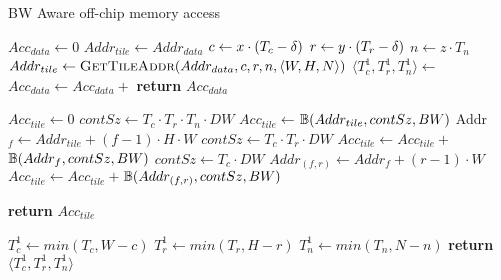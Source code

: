 \begin{algorithm}[H]
	\caption{BW Aware off-chip memory access}
	 \label{Algorithm1}
	 \begin{algorithmic}[1]
	 	 \label{alg:BWA}
	 	\State $Acc_{data}\gets 0$
	 	\State $Addr_{tile}\gets Addr_{data}$
        \State $c\gets x\cdot (T_c-\delta)$\label{alg:idxc}
        \State $r\gets y\cdot (T_r-\delta)$\label{alg:idxr}
        \State $n\gets z\cdot T_n$\label{alg:idxn}
        \State $Addr_{tile}\gets \Call{GetTileAddr}{Addr_{data},c,r,n,\langle W,H,N\rangle}$\label{alg:tileAddr}
        \State $\langle T_c^1,T_r^1,T_n^1\rangle\gets$ \label{alg:tileDim}
        \State $Acc_{data}\gets Acc_{data}+$ \label{alg:tileAcc}
	 	\label{alg:UpDiag_ReuseR2}   
	 	\EndFor \label{alg:loopkEnd}
	 	\State \textbf{return} $Acc_{data}$
	 	\EndProcedure
	 	
	 	 \label{alg:FuncTileAccess}
	    \State $Acc_{tile}\gets 0$
	    	\State$contSz\gets T_c\cdot T_r\cdot T_n\cdot DW$\label{alg:TileAccessSingleTxn}
	    	\State$Acc_{tile}{\gets}$$\mathbb{B}({Addr_{tile},contSz,BW})$\label{alg:TileAccessIf1End}
	    \Else
	    	       \State Addr$_{f}{\gets} Addr_{tile}{+}(f{-}1){\cdot}H{\cdot}W$\label{alg:TileAccessFrameAddr}
   					    \State $contSz{\gets}T_c\cdot T_r\cdot DW$
                        \State $Acc_{tile}{\gets}Acc_{tile}+$$\mathbb{B}({Addr_f,contSz,BW})$\label{alg:TileAccess2}
	    	       \Else
	    	           \State $contSz{\gets}T_c{\cdot}DW$
                            \State $Addr_{(f,r)}{\gets}Addr_{f}+(r-1)\cdot W$\label{alg:TileRowAddr}
                            \State $Acc_{tile}{\gets}Acc_{tile}+$$\mathbb{B}({Addr_{(f,r)},contSz,BW})$\label{alg:TileAccessFor2End}
	    	           \EndFor
	    	       \EndIf
	            \EndFor	
	    
	    \EndIf
	    \label{alg:FuncTileAccessEnd}	 	
	 	\State \textbf{return} $Acc_{tile}$
	 	\EndProcedure	
	
	
	 	 \label{alg:FuncTileDimEnd}
	 	\State $T^1_c\gets min(T_c,W-c)$
	 	\State $T^1_r\gets min(T_r,H-r)$
	 	\State $T^1_n\gets min(T_n,N-n)$
	 	\State \textbf{return} ${\langle T^1_c,T^1_r,T^1_n\rangle}$
	 	\EndProcedure

	\end{algorithmic}
\end{algorithm}